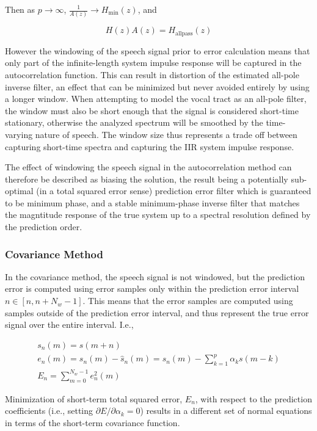 \noindent
Then as $p \rightarrow \infty$, $\frac{1}{A(z)} \rightarrow H_{\mathrm{min}}(z)$, and

\begin{equation}
	H(z) A(z) = H_{\mathrm{allpass}}(z) 
\end{equation}

However the windowing of the speech signal prior to error calculation means that only part of the infinite-length system impulse response will be captured in the autocorrelation function. This can result in distortion of the estimated all-pole inverse filter, an effect that can be minimized but never avoided entirely by using a longer window. When attempting to model the vocal tract as an all-pole filter, the window must also be short enough that the signal is considered short-time stationary, otherwise the analyzed spectrum will be smoothed by the time-varying nature of speech. The window size thus represents a trade off between capturing short-time spectra and capturing the IIR system impulse response. 

The effect of windowing the speech signal in the autocorrelation method can therefore be described as biasing the solution, the result being a potentially sub-optimal (in a total squared error sense) prediction error filter which is guaranteed to be minimum phase, and a stable minimum-phase inverse filter that matches the magntitude response of the true system up to a spectral resolution defined by the prediction order.


\subsubsection{Covariance Method} \label{lp_cov}

In the covariance method, the speech signal is not windowed, but the prediction error is computed using error samples only within the prediction error interval $n \in [n, n+N_w-1]$. This means that the error samples are computed using samples outside of the prediction error interval, and thus represent the true error signal over the entire interval. I.e.,

\begin{eqnarray}
	s_n(m) = s(m+n) \\
	e_n(m) = s_n(m) - \hat{s}_n(m) = s_n(m) - \sum_{k=1}^{p} \alpha_k s(m-k) \\
	E_n = \sum_{m=0}^{N_w-1} e_n^2(m) \label{eq:cov_tse}
\end{eqnarray}

 Minimization of short-term total squared error, $E_n$, with respect to the prediction coefficients (i.e., setting $\partial E/\partial \alpha_k=0$) results in a different set of normal equations in terms of the short-term covariance function. 
 

